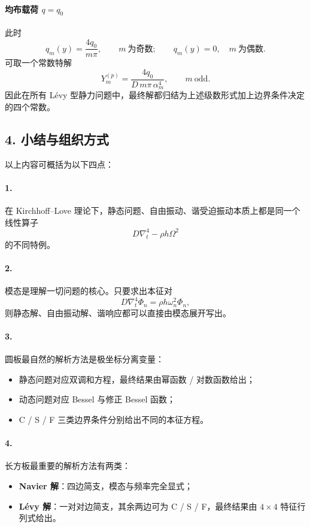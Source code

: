 \documentclass[12pt]{ctexart}
\begin{document}
\paragraph{均布载荷 \(q=q_0\)}
此时
\[
q_m(y)=\frac{4q_0}{m\pi},
\qquad m\ \text{为奇数};
\qquad
q_m(y)=0,\quad m\ \text{为偶数}.
\]
可取一个常数特解
\[
Y_m^{(p)}=\frac{4q_0}{D\,m\pi\,\alpha_m^4},
\qquad m\ \text{odd}.
\]
因此在所有 L\'evy 型静力问题中，最终解都归结为上述级数形式加上边界条件决定的四个常数。

\subsection*{4. 小结与组织方式}

以上内容可概括为以下四点：

\paragraph{1.}
在 Kirchhoff--Love 理论下，静态问题、自由振动、谐受迫振动本质上都是同一个线性算子
\[
D\nabla_t^4-\rho h\Omega^2
\]
的不同特例。

\paragraph{2.}
模态是理解一切问题的核心。只要求出本征对
\[
D\nabla_t^4\Phi_n=\rho h\omega_n^2\Phi_n,
\]
则静态解、自由振动解、谐响应都可以直接由模态展开写出。

\paragraph{3.}
圆板最自然的解析方法是极坐标分离变量：
\begin{itemize}
\item 静态问题对应双调和方程，最终结果由幂函数 / 对数函数给出；
\item 动态问题对应 Bessel 与修正 Bessel 函数；
\item C / S / F 三类边界条件分别给出不同的本征方程。
\end{itemize}

\paragraph{4.}
长方板最重要的解析方法有两类：
\begin{itemize}
\item \textbf{Navier 解}：四边简支，模态与频率完全显式；
\item \textbf{L\'evy 解}：一对对边简支，其余两边可为 C / S / F，最终结果由 \(4\times4\) 特征行列式给出。
\end{itemize}
\end{document}
